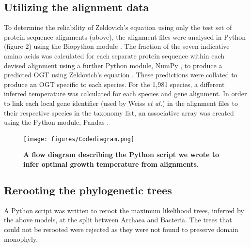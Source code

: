 \subsection{Utilizing the alignment data}

To determine the reliability of Zeldovich’s equation using only the test set of protein sequence alignments (above), the alignment files were analysed in Python (figure 2) using the Biopython module \cite{chapman2000biopython}. The fraction of the seven indicative amino acids was calculated for each separate protein sequence within each devised alignment using a further Python module, NumPy \cite{walt2011numpy}, to produce a predicted OGT using Zeldovich’s equation \cite{zeldovich2007}. These predictions were collated to produce an OGT specific to each species. For the 1,981 species, a different inferred temperature was calculated for each species and gene alignment. In order to link each local gene identifier (used by Weiss \textit{et al.}) in the alignment files to their respective species in the taxonomy list, an associative array was created using the Python module, Pandas \cite{mckinney2010data}.

\begin{figure}
\texttt{[image: figures/Codediagram.png]}
\centering
\caption{\textbf{A flow diagram describing the Python script we wrote to infer optimal growth temperature from alignments.}}
\end{figure}





\subsection{Rerooting the phylogenetic trees}
A Python script was written to reroot the maximum likelihood trees, inferred by the above models, at the split between Archaea and Bacteria. The trees that could not be rerooted were rejected as they were not found to preserve domain monophyly. 

